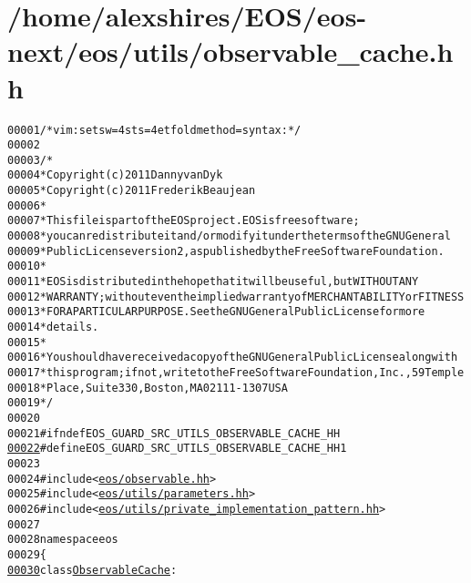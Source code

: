 \hypertarget{observable__cache_8hh_source}{
\section{/home/alexshires/EOS/eos-\/next/eos/utils/observable\_\-cache.hh}
}


\begin{footnotesize}\begin{alltt}
00001 \textcolor{comment}{/* vim: set sw=4 sts=4 et foldmethod=syntax : */}
00002 
00003 \textcolor{comment}{/*}
00004 \textcolor{comment}{ * Copyright (c) 2011 Danny van Dyk}
00005 \textcolor{comment}{ * Copyright (c) 2011 Frederik Beaujean}
00006 \textcolor{comment}{ *}
00007 \textcolor{comment}{ * This file is part of the EOS project. EOS is free software;}
00008 \textcolor{comment}{ * you can redistribute it and/or modify it under the terms of the GNU General}
00009 \textcolor{comment}{ * Public License version 2, as published by the Free Software Foundation.}
00010 \textcolor{comment}{ *}
00011 \textcolor{comment}{ * EOS is distributed in the hope that it will be useful, but WITHOUT ANY}
00012 \textcolor{comment}{ * WARRANTY; without even the implied warranty of MERCHANTABILITY or FITNESS}
00013 \textcolor{comment}{ * FOR A PARTICULAR PURPOSE.  See the GNU General Public License for more}
00014 \textcolor{comment}{ * details.}
00015 \textcolor{comment}{ *}
00016 \textcolor{comment}{ * You should have received a copy of the GNU General Public License along with}
00017 \textcolor{comment}{ * this program; if not, write to the Free Software Foundation, Inc., 59 Temple}
00018 \textcolor{comment}{ * Place, Suite 330, Boston, MA  02111-1307  USA}
00019 \textcolor{comment}{ */}
00020 
00021 \textcolor{preprocessor}{#ifndef EOS\_GUARD\_SRC\_UTILS\_OBSERVABLE\_CACHE\_HH}
\hypertarget{observable__cache_8hh_source_l00022}{}\hyperlink{observable__cache_8hh_a6c94a37b947cd51d6745ff3e6ef9ee85}{00022} \textcolor{preprocessor}{}\textcolor{preprocessor}{#define EOS\_GUARD\_SRC\_UTILS\_OBSERVABLE\_CACHE\_HH 1}
00023 \textcolor{preprocessor}{}
00024 \textcolor{preprocessor}{#include <\hyperlink{observable_8hh}{eos/observable.hh}>}
00025 \textcolor{preprocessor}{#include <\hyperlink{parameters_8hh}{eos/utils/parameters.hh}>}
00026 \textcolor{preprocessor}{#include <\hyperlink{private__implementation__pattern_8hh}{eos/utils/private_implementation_pattern.hh}>}
00027 
00028 \textcolor{keyword}{namespace }eos
00029 \{
\hypertarget{observable__cache_8hh_source_l00030}{}\hyperlink{classeos_1_1ObservableCache}{00030}     \textcolor{keyword}{class }\hyperlink{classeos_1_1ObservableCache}{ObservableCache} :

\end{alltt}
\end{footnotesize}

